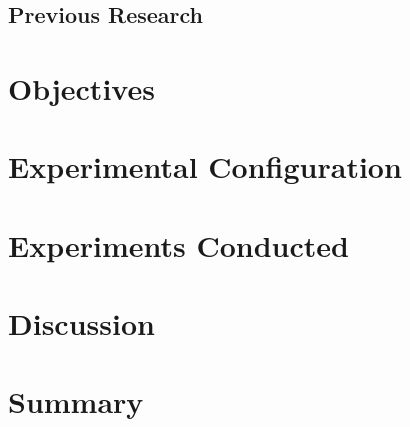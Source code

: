 \documentclass[12pt,oneside]{book}
\begin{document}
\section{Previous Research}

\chapter{Objectives}

\chapter{Experimental Configuration}

\chapter{Experiments Conducted}

\chapter{Discussion}

\chapter{Summary}



\clearpage

\appendix
\end{document}
